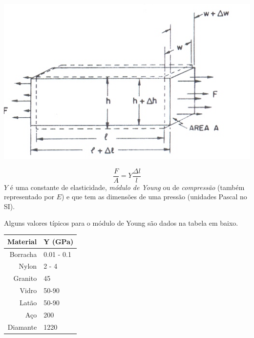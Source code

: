 \documentclass[a4paper,12pt]{article}
\begin{document}
\begin{minipage}[c]{0.6\textwidth}
\begin{center}
	\includegraphics[width=0.8\linewidth]{moduloYoung}
\label{fig:fig1}            
\end{center}
\end{minipage}
\begin{minipage}[c]{0.4\textwidth}
\begin{equation}
	\label{eq:vc}
	 \frac{F}{A}  = Y  \frac{\Delta l}{l} 
\end{equation}
$Y$ é uma constante de elasticidade, \emph{módulo de Young} ou de \emph{compressão} (também representado por $E$) e que tem as dimensões de uma pressão (unidades Pascal no SI).
\end{minipage}

Alguns valores típicos para o módulo de Young são dados na tabela em baixo.

\begin{center}
\begin{tabular}{|r|l|}
\hline
\textbf{Material} & \textbf{Y (GPa)}\\
\hline
Borracha & 0.01 - 0.1\\
Nylon & 2 - 4 \\ %
Granito & 45 \\
Vidro & 50-90 \\
Latão & 50-90 \\
Aço  & 200 \\
Diamante  & 1220 \\
\hline
\end{tabular}
\end{center}
\end{document}
